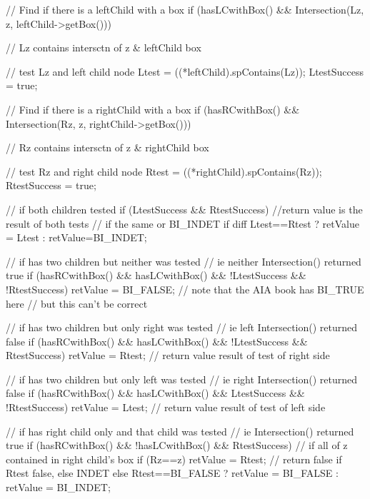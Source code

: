 \begin{DoxyCode}
{{            // Find if there is a leftChild with a box
            if (hasLCwithBox() &&
                Intersection(Lz, z, leftChild->getBox())) {
                // Lz contains intersctn of z & leftChild box

                // test Lz and left child node
                Ltest = ((*leftChild).spContains(Lz));
                LtestSuccess = true;
            }


            // Find if there is a rightChild with a box
            if (hasRCwithBox() &&
                Intersection(Rz, z, rightChild->getBox())) {
                // Rz contains intersctn of z & rightChild box

                // test Rz and right child node
                Rtest = ((*rightChild).spContains(Rz));
                RtestSuccess = true;
            }

            // if both children tested
            if (LtestSuccess && RtestSuccess) {
                //return value is the result of both tests
                    // if the same or BI_INDET if diff
                Ltest==Rtest ?
                    retValue = Ltest : retValue=BI_INDET;
            }

            // if has two children but neither was tested
            // ie neither Intersection() returned true
            if (hasRCwithBox() && hasLCwithBox()
                && !LtestSuccess && !RtestSuccess) {
                retValue = BI_FALSE;
                // note that the AIA book has BI_TRUE here
                // but this can't be correct
            }

            // if has two children but only right was tested
            // ie left Intersection() returned false
            if (hasRCwithBox() && hasLCwithBox()
                && !LtestSuccess && RtestSuccess) {
                retValue = Rtest;
                // return value result of test of right side
            }

            // if has two children but only left was tested
            // ie right Intersection() returned false
            if (hasRCwithBox() && hasLCwithBox()
                && LtestSuccess && !RtestSuccess) {
                retValue = Ltest;
                // return value result of test of left side
            }

            // if has right child only and that child was tested
            // ie Intersection() returned true
            if (hasRCwithBox()
                && !hasLCwithBox() && RtestSuccess) {
                // if all of z contained in right child's box
                if (Rz==z) {
                    retValue = Rtest;
                }
                // return false if Rtest false, else INDET
                else {
                    Rtest==BI_FALSE ? retValue = BI_FALSE
                        : retValue = BI_INDET;
                }
            }

}}
\end{DoxyCode}

